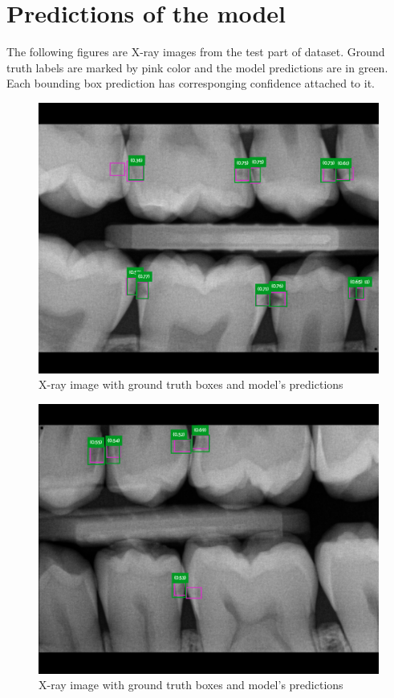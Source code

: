 \section{Predictions of the model}
The following figures are X-ray images from the test part of dataset. Ground truth labels are marked by pink color and the model predictions are in green. Each bounding box prediction has corresponging confidence attached to it.
\begin{figure}[H]
    \includegraphics[width=0.9\linewidth]{images/no_rest1.png}
    \caption{X-ray image with ground truth boxes and model's predictions}
    \label{fig:pred_img1}
\end{figure}

\begin{figure}[H]
    \includegraphics[width=0.9\linewidth]{images/no_rest2.png}
    \caption{X-ray image with ground truth boxes and model's predictions}
    \label{fig:pred_img2}
\end{figure}

